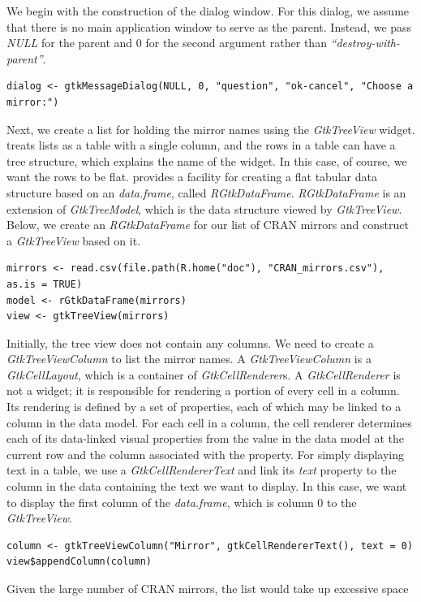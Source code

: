 \documentclass[article]{jss}
\begin{document}
We begin with the construction of the dialog window. For this dialog, we 
assume that there is no main application window to serve as the parent. 
Instead, we pass \emph{NULL} for the parent and $0$ for the second argument 
rather than \emph{``destroy-with-parent''}.
\begin{verbatim}
dialog <- gtkMessageDialog(NULL, 0, "question", "ok-cancel", "Choose a mirror:")
\end{verbatim}
Next, we create a list for holding the mirror names using the \emph{GtkTreeView}
widget.  treats lists as a table with a single column, and the rows in
a table can have a tree structure, which explains the name of the widget.
In this case, of course, we want the rows to be flat.  provides a 
facility for creating a flat tabular data structure based on an 
\emph{data.frame}, called \emph{RGtkDataFrame}. \emph{RGtkDataFrame} is
an extension of \emph{GtkTreeModel}, which is the data structure viewed by
\emph{GtkTreeView}. Below, we create an \emph{RGtkDataFrame} for our list
of CRAN mirrors and construct a \emph{GtkTreeView} based on it.
\begin{verbatim}
mirrors <- read.csv(file.path(R.home("doc"), "CRAN_mirrors.csv"), as.is = TRUE)
model <- rGtkDataFrame(mirrors)
view <- gtkTreeView(mirrors)
\end{verbatim}
Initially, the tree view does not contain any columns. We need to
create a \emph{GtkTreeViewColumn} to list the mirror names. A \emph{GtkTreeViewColumn}
is a \emph{GtkCellLayout}, which is a container of \emph{GtkCellRenderer}s. 
A \emph{GtkCellRenderer} is not a widget; it is responsible for rendering
a portion of every cell in a column. Its rendering is defined by a set of
properties, each of which may be linked to a column in the data model. For each
cell in a column, the cell renderer determines each of its data-linked visual
properties from the value in the data model at the current
row and the column associated with the property. For simply displaying
text in a table, we use a \emph{GtkCellRendererText} and link its \emph{text}
property to the column in the data containing the text we want to display.
In this case, we want to display the first column of the \emph{data.frame},
which is column $0$ to the \emph{GtkTreeView}.
\begin{verbatim}
column <- gtkTreeViewColumn("Mirror", gtkCellRendererText(), text = 0)
view$appendColumn(column)
\end{verbatim}
Given the large number of CRAN mirrors, the list would take up excessive space
\end{document}
